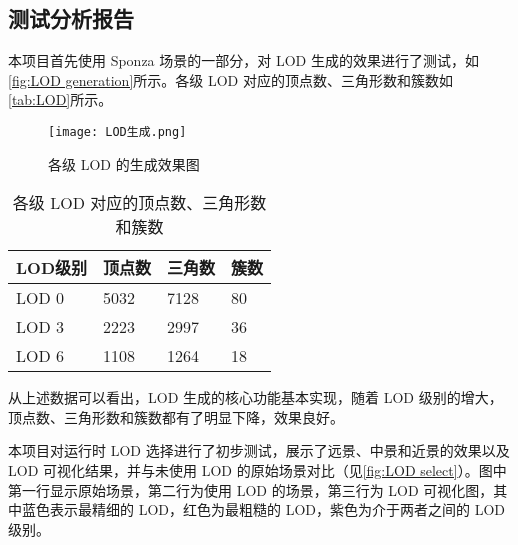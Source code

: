 \subsection{测试分析报告}

本项目首先使用 Sponza 场景的一部分，对 LOD 生成的效果进行了测试，如\autoref{fig:LOD generation}所示。各级 LOD 对应的顶点数、三角形数和簇数如\autoref{tab:LOD}所示。

\begin{figure}[!htb]
    \centering
    \texttt{[image: LOD生成.png]}
    \caption{\label{fig:LOD generation}各级 LOD 的生成效果图}
\end{figure}

\begin{table}[!htb]
    \caption{\label{tab:LOD}各级 LOD 对应的顶点数、三角形数和簇数}
    \begin{tabularx}{\linewidth}{|X<{\centering}|X<{\centering}|X<{\centering}|X<{\centering}|}
        \hline
        LOD级别 & 顶点数 & 三角数 & 簇数 \\ \hline
        LOD 0 & 5032 & 7128 & 80 \\ \hline
        LOD 3 & 2223 & 2997 & 36 \\ \hline
        LOD 6 & 1108 & 1264 & 18 \\ \hline
    \end{tabularx}
\end{table}

从上述数据可以看出，LOD 生成的核心功能基本实现，随着 LOD 级别的增大，顶点数、三角形数和簇数都有了明显下降，效果良好。

本项目对运行时 LOD 选择进行了初步测试，展示了远景、中景和近景的效果以及 LOD 可视化结果，并与未使用 LOD 的原始场景对比（见\autoref{fig:LOD select}）。图中第一行显示原始场景，第二行为使用 LOD 的场景，第三行为 LOD 可视化图，其中蓝色表示最精细的 LOD，红色为最粗糙的 LOD，紫色为介于两者之间的 LOD 级别。

